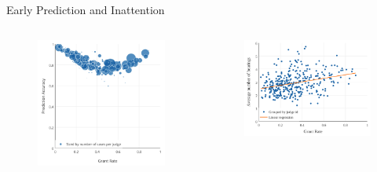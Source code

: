 \begin{frame}{Early Prediction and Inattention}
    \begin{columns}[T]
    \begin{column}{0.4\textwidth}

        \begin{figure}
            \centering
            \includegraphics[height = 0.7 \textheight]{images/ep_byrate1.png}
            \end{figure}
    \end{column}
        
    \begin{column}{0.55\textwidth}

        \begin{figure}
            \centering
            \includegraphics[height = 0.7 \textheight]{images/ep_byrate2.png}
            \end{figure}
    \end{column}
        
    \end{columns}
    
\end{frame}